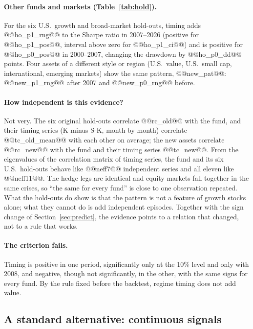 \documentclass[11pt,a4paper]{article}
\begin{document}
\paragraph{Other funds and markets (Table~\ref{tab:hold}).} For the six U.S.\ growth and broad-market hold-outs,
timing adds @@ho_p1_rng@@ to the Sharpe ratio in 2007--2026 (positive for @@ho_p1_pos@@, interval above zero for
@@ho_p1_ci@@) and is positive for @@ho_p0_pos@@ in 2000--2007, changing the drawdown by @@ho_p0_dd@@ points. Four assets of a
different style or region (U.S.\ value, U.S.\ small cap, international, emerging markets) show the same pattern,
@@new_pat@@: @@new_p1_rng@@ after 2007 and @@new_p0_rng@@ before.

\paragraph{How independent is this evidence?} Not very. The six original hold-outs correlate @@rc_old@@ with the
fund, and their timing series (K minus S-K, month by month) correlate @@tc_old_mean@@ with each other on average; the
new assets correlate @@rc_new@@ with the fund and their timing series @@tc_new@@. From the eigenvalues of the
correlation matrix of timing series, the fund and its six U.S.\ hold-outs behave like @@neff7@@ independent series and all
eleven like @@neff11@@. The hedge legs are identical and equity markets fall together in the same crises, so ``the
same for every fund'' is close to one observation repeated. What the hold-outs do show is that the pattern is
not a feature of growth stocks alone; what they cannot do is add independent episodes. Together with the sign
change of Section~\ref{sec:predict}, the evidence points to a relation that changed, not to a rule that works.

\paragraph{The criterion fails.} Timing is positive in one period, significantly only at the 10\% level and only
with 2008, and negative, though not significantly, in the other, with the same signs for every fund. By the rule fixed before the backtest, regime timing does not add value.

\subsection{A standard alternative: continuous signals}
\label{sec:model}
\end{document}
